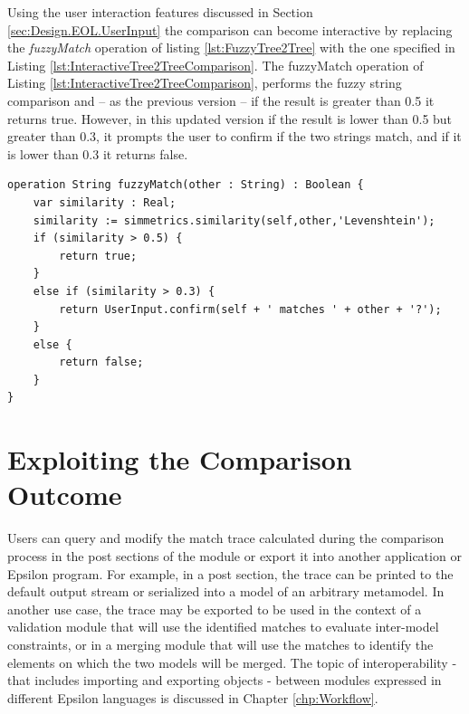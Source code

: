 Using the user interaction features discussed in Section \ref{sec:Design.EOL.UserInput} the comparison can become interactive by replacing the \emph{fuzzyMatch} operation of listing \ref{lst:FuzzyTree2Tree} with the one specified in Listing \ref{lst:InteractiveTree2TreeComparison}. The fuzzyMatch operation of Listing \ref{lst:InteractiveTree2TreeComparison}, performs the fuzzy string comparison and -- as the previous version -- if the result is greater than 0.5 it returns true. However, in this updated version if the result is lower than 0.5 but greater than 0.3, it prompts the user to confirm if the two strings match, and if it is lower than 0.3 it returns false.

\begin{lstlisting}[basicstyle=\ttfamily\footnotesize, flexiblecolumns=true, numbers=none, nolol=true, caption=An interactive version of the fuzzyMatch operation of Listing \ref{lst:FuzzyTree2Tree}, label=lst:InteractiveTree2TreeComparison, language=ECL, numbers=left, tabsize=2]
operation String fuzzyMatch(other : String) : Boolean {
	var similarity : Real;
	similarity := simmetrics.similarity(self,other,'Levenshtein');
	if (similarity > 0.5) {
		return true;
	}
	else if (similarity > 0.3) {
		return UserInput.confirm(self + ' matches ' + other + '?');
	}
	else {
		return false;
	}
}\end{lstlisting}

\section{Exploiting the Comparison Outcome}

Users can query and modify the match trace calculated during the comparison process in the post sections of the module or export it into another application or Epsilon program. For example, in a post section, the trace can be printed to the default output stream or serialized into a model of an arbitrary metamodel. In another use case, the trace may be exported to be used in the context of a validation module that will use the identified matches to evaluate inter-model constraints, or in a merging module that will use the matches to identify the elements on which the two models will be merged. The topic of interoperability - that includes importing and exporting objects - between modules expressed in different Epsilon languages is discussed in Chapter \ref{chp:Workflow}.